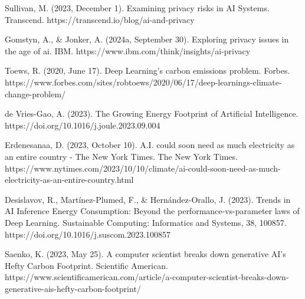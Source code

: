 \documentclass[licencjacka,en]{pracamgr}
\begin{document}
\begin{thebibliography}{99}
Sullivan, M. (2023, December 1). Examining privacy risks in AI Systems. Transcend. https://transcend.io/blog/ai-and-privacy

Gomstyn, A., \& Jonker, A. (2024a, September 30). Exploring privacy issues in the age of ai. IBM. https://www.ibm.com/think/insights/ai-privacy

Toews, R. (2020, June 17). Deep Learning’s carbon emissions problem. Forbes. https://www.forbes.com/sites/robtoews/2020/06/17/deep-learnings-climate-change-problem/

de Vries-Gao, A. (2023). The Growing Energy Footprint of Artificial Intelligence. https://doi.org/10.1016/j.joule.2023.09.004

Erdenesanaa, D. (2023, October 10). A.I. could soon need as much electricity as an entire country - The New York Times. The New York Times. https://www.nytimes.com/2023/10/10/climate/ai-could-soon-need-as-much-electricity-as-an-entire-country.html

Desislavov, R., Martínez-Plumed, F., \& Hernández-Orallo, J. (2023). Trends in AI Inference Energy Consumption: Beyond the performance-vs-parameter laws of Deep Learning. Sustainable Computing: Informatics and Systems, 38, 100857. https://doi.org/10.1016/j.suscom.2023.100857

Saenko, K. (2023, May 25). A computer scientist breaks down generative AI’s Hefty Carbon Footprint. Scientific American. https://www.scientificamerican.com/article/a-computer-scientist-breaks-down-generative-ais-hefty-carbon-footprint/


\end{thebibliography}
\end{document}

